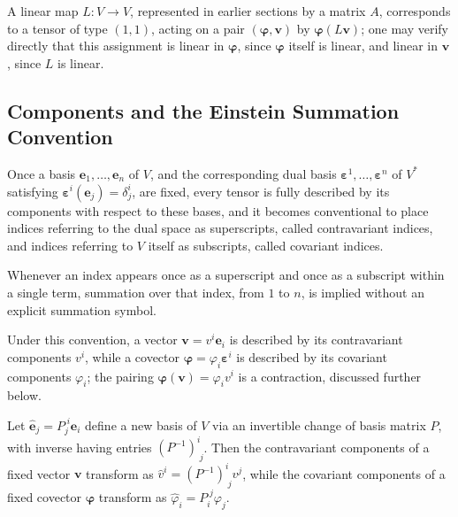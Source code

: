 A linear map $L : V \to V$, represented in earlier sections by a matrix $A$, corresponds to a tensor of type $(1,1)$, acting on a pair $(\boldsymbol{\varphi}, \mathbf{v})$ by $\boldsymbol{\varphi}(L\mathbf{v})$; one may verify directly that this assignment is linear in $\boldsymbol{\varphi}$, since $\boldsymbol{\varphi}$ itself is linear, and linear in $\mathbf{v}$, since $L$ is linear.

\subsection{Components and the Einstein Summation Convention}

Once a basis $\mathbf{e}_1, \dots, \mathbf{e}_n$ of $V$, and the corresponding dual basis $\boldsymbol{\varepsilon}^1, \dots, \boldsymbol{\varepsilon}^n$ of $V^{*}$ satisfying $\boldsymbol{\varepsilon}^i(\mathbf{e}_j) = \delta^i_j$, are fixed, every tensor is fully described by its components with respect to these bases, and it becomes conventional to place indices referring to the dual space as superscripts, called contravariant indices, and indices referring to $V$ itself as subscripts, called covariant indices.

\begin{definition}
Whenever an index appears once as a superscript and once as a subscript within a single term, summation over that index, from $1$ to $n$, is implied without an explicit summation symbol.
\end{definition}

Under this convention, a vector $\mathbf{v} = v^i \mathbf{e}_i$ is described by its contravariant components $v^i$, while a covector $\boldsymbol{\varphi} = \varphi_i \boldsymbol{\varepsilon}^i$ is described by its covariant components $\varphi_i$; the pairing $\boldsymbol{\varphi}(\mathbf{v}) = \varphi_i v^i$ is a contraction, discussed further below.

\begin{theorem}
Let $\hat{\mathbf{e}}_j = P_j^{\;i}\mathbf{e}_i$ define a new basis of $V$ via an invertible change of basis matrix $P$, with inverse having entries $(P^{-1})^i_{\;j}$. Then the contravariant components of a fixed vector $\mathbf{v}$ transform as $\hat{v}^i = (P^{-1})^i_{\;j}v^j$, while the covariant components of a fixed covector $\boldsymbol{\varphi}$ transform as $\hat\varphi_i = P_i^{\;j}\varphi_j$.
\end{theorem}

